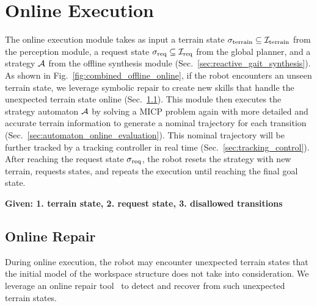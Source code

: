 \documentclass[letterpaper, 10 pt, conference]{ieeeconf}
\begin{document}
\section{Online Execution}\label{sec:online_execution}
The online execution module takes as input
a terrain state $\sigma_{\textrm{terrain}} \subseteq {\mathcal I}_{\textrm{terrain}}$
from the perception module, 
a request state $\sigma_{\textrm{req}} \subseteq {\mathcal I}_{\textrm{req}}$
from the global planner,
and a strategy ${\mathcal A}$
from the offline synthesis module (Sec.~\ref{sec:reactive_gait_synthesis}).
As shown in Fig.~\ref{fig:combined_offline_online},
if the robot encounters an unseen terrain state, 
we leverage symbolic repair to create new skills that handle the unexpected terrain state online 
(Sec.~\ref{sec:online_repair}).
This module then executes the strategy automaton ${\mathcal A}$
by solving a MICP problem again 
with more detailed and accurate terrain information 
to generate a nominal trajectory for each transition (Sec.~\ref{sec:automaton_online_evaluation}). This nominal trajectory will be further tracked by a tracking controller in real time
(Sec.~\ref{sec:tracking_control}).
After reaching the request state $\sigma_{\textrm{req}}$,
the robot resets the strategy with new terrain, requests states,
and repeats the execution
until reaching the final goal state.






\textbf{Given: 1. terrain state, 2. request state, 3. disallowed transitions}
\subsection{Online Repair}\label{sec:online_repair}
During online execution, 
the robot may encounter unexpected terrain states
that the initial model of the workspace structure does not take into consideration.
We leverage an online repair tool~\cite{meng2024automated} 
to detect and recover from such unexpected terrain states.
\end{document}
